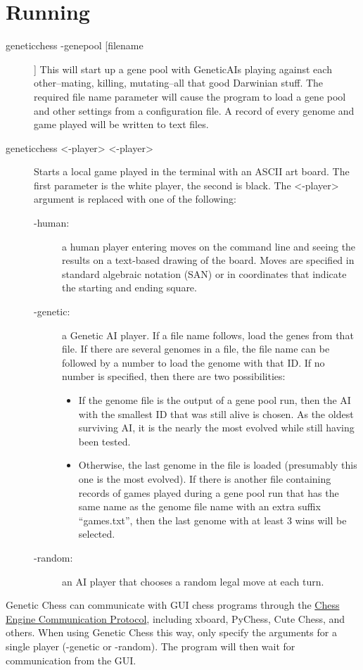 \documentclass[letterpaper]{article}
\newcommand{\code}[1]{#1}
\renewcommand\_{\textunderscore\allowbreak}
\begin{document}
\section{Running}
\label{running}
\begin{description}
	\item[\code{genetic\_chess -genepool [file\_name]}]
This will start up a gene pool with Genetic\_AIs playing against each other--mating, killing, mutating--all that good Darwinian stuff. The required file name parameter will cause the program to load a gene pool and other settings from a configuration file. A record of every genome and game played will be written to text files.

	\item[\code{genetic\_chess <-player> <-player>}] Starts a local game played in the terminal with an ASCII art board. The first parameter is the white player, the second is black. The \code{<-player>} argument is replaced with one of the following:
	\begin{description}
		\item[\code{-human}:] a human player entering moves on the command line and seeing the results on a text-based drawing of the board. Moves are specified in standard algebraic notation (SAN) or in coordinates that indicate the starting and ending square. 
		\item[\code{-genetic}:] a Genetic AI player. If a file name follows, load the genes from that file. If there are several genomes in a file, the file name can be followed by a number to load the genome with that ID. If no number is specified, then there are two possibilities:
		\begin{itemize}
			\item If the genome file is the output of a gene pool run, then the AI with the smallest ID that was still alive is chosen. As the oldest surviving AI, it is the nearly the most evolved while still having been tested.
			\item Otherwise, the last genome in the file is loaded (presumably this one is the most evolved). If there is another file containing records of games played during a gene pool run that has the same name as the genome file name with an extra suffix ``\_games.txt'', then the last genome with at least 3 wins will be selected.
		\end{itemize}
		\item[\code{-random}:] an AI player that chooses a random legal move at each turn.
	\end{description}
\end{description}
Genetic Chess can communicate with GUI chess programs through the \href{https://www.gnu.org/software/xboard/engine-intf.html}{Chess Engine Communication Protocol}, including xboard, PyChess, Cute Chess, and others. When using Genetic Chess this way, only specify the arguments for a single player (\code{-genetic} or \code{-random}). The program will then wait for communication from the GUI.
\end{document}

